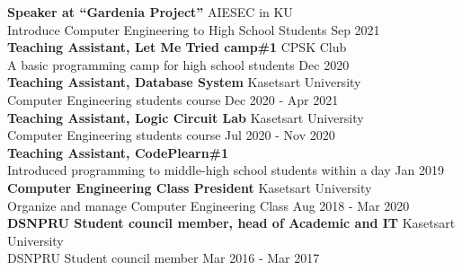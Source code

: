 \textbf{Speaker at “Gardenia Project”} \hfill AIESEC in KU\\
Introduce Computer Engineering to High School Students \hfill Sep 2021\\
\vspace*{2mm}
\textbf{Teaching Assistant, Let Me Tried camp\#1} \hfill CPSK Club\\
A basic programming camp for high school students \hfill Dec 2020\\
\vspace*{2mm}
\textbf{Teaching Assistant, Database System} \hfill Kasetsart University\\
Computer Engineering students course \hfill Dec 2020 - Apr 2021\\
\vspace*{2mm}
\textbf{Teaching Assistant, Logic Circuit Lab} \hfill Kasetsart University\\
Computer Engineering students course \hfill Jul 2020 - Nov 2020\\
\vspace*{2mm}
\textbf{Teaching Assistant, CodePlearn\#1}\\
Introduced programming to middle-high school students within a day \hfill Jan 2019\\
\vspace*{2mm}
\textbf{Computer Engineering Class President} \hfill Kasetsart University\\
Organize and manage Computer Engineering Class \hfill Aug 2018 - Mar 2020\\
\vspace*{2mm}
\textbf{DSNPRU Student council member, head of Academic and IT} \hfill Kasetsart University\\
DSNPRU Student council member \hfill Mar 2016 - Mar 2017\\
\vspace*{2mm}
